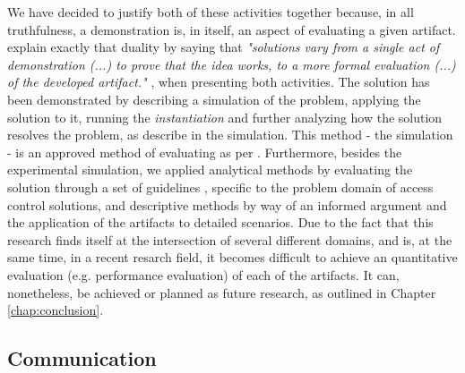 We have decided to justify both of these activities together because, in all truthfulness, a demonstration is, in itself, an aspect of evaluating a given artifact. \citeauthor{peffers_design_2007} explain exactly that duality by saying that \textit{"solutions vary from a single act of demonstration (...) to prove that the idea works, to a more formal evaluation (...) of the developed artifact."} \cite[13]{peffers_design_2007}, when presenting both activities. The solution has been demonstrated by describing a simulation of the problem, applying the solution to it, running the \textit{instantiation} and further analyzing how the solution resolves the problem, as describe in the simulation. This method - the simulation - is an approved method of evaluating as per \citeauthor{hevner_design_2004} \cite[13]{hevner_design_2004}. Furthermore, besides the experimental simulation, we applied analytical methods by evaluating the solution through a set of guidelines \cite{hu_guidelines_2012}, specific to the problem domain of access control solutions, and descriptive methods by way of an informed argument and the application of the artifacts to detailed scenarios. Due to the fact that this research finds itself at the intersection of several different domains, and is, at the same time, in a recent resarch field, it becomes difficult to achieve an quantitative evaluation (e.g. performance evaluation) of each of the artifacts. It can, nonetheless, be achieved or planned as future research, as outlined in Chapter \ref{chap:conclusion}.

\subsection{Communication}

